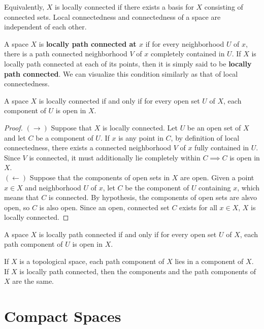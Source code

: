 \documentclass{article}
\begin{document}
    Equivalently, $X$ is locally connected if there exists a basis for $X$ consisting of connected sets. Local connectedness and connectedness of a space are independent of each other. 

    \begin{definition}
    A space $X$ is \textbf{locally path connected at $x$} if for every neighborhood $U$ of $x$, there is a path connected neighborhood $V$ of $x$ completely contained in $U$. If $X$ is locally path connected at each of its points, then it is simply said to be \textbf{locally path connected}. We can visualize this condition similarly as that of local connectedness. 
    \end{definition}

    \begin{theorem}
    A space $X$ is locally connected if and only if for every open set $U$ of $X$, each component of $U$ is open in $X$. 
    \end{theorem}
    \begin{proof}
    $(\rightarrow)$ Suppose that $X$ is locally connected. Let $U$ be an open set of $X$ and let $C$ be a component of $U$. If $x$ is any point in $C$, by definition of local connectedness, there exists a connected neighborhood $V$ of $x$ fully contained in $U$. Since $V$ is connected, it must additionally lie completely within $C \implies C$ is open in $X$. \\
    $(\leftarrow)$ Suppose that the components of open sets in $X$ are open. Given a point $x \in X$ and neighborhood $U$ of $x$, let $C$ be the component of $U$ containing $x$, which means that $C$ is connected. By hypothesis, the components of open sets are alsvo open, so $C$ is also open. Since an open, connected set $C$ exists for all $x \in X$, $X$ is locally connected. 
    \end{proof}

    \begin{theorem}
    A space $X$ is locally path connected if and only if for every open set $U$ of $X$, each path component of $U$ is open in $X$.
    \end{theorem}

    \begin{theorem}
    If $X$ is a topological space, each path component of $X$ lies in a component of $X$. If $X$ is locally path connected, then the components and the path components of $X$ are the same. 
    \end{theorem}

\section{Compact Spaces}
\end{document}
